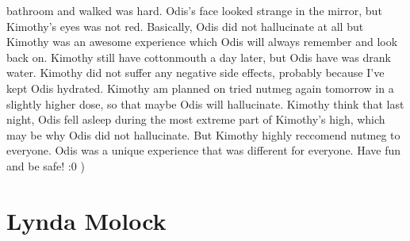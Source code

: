 \documentclass[12pt]{book}
\begin{document}
bathroom and walked was hard. Odis's face looked strange in the mirror, but Kimothy's eyes was not red. Basically, Odis did not hallucinate at all but Kimothy was an awesome experience which Odis will always remember and look back on. Kimothy still have cottonmouth a day later, but Odis have was drank water. Kimothy did not suffer any negative side effects, probably because I've kept Odis hydrated. Kimothy am planned on tried nutmeg again tomorrow in a slightly higher dose, so that maybe Odis will hallucinate. Kimothy think that last night, Odis fell asleep during the most extreme part of Kimothy's high, which may be why Odis did not hallucinate. But Kimothy highly reccomend nutmeg to everyone. Odis was a unique experience that was different for everyone. Have fun and be safe! :0 )



\chapter{Lynda Molock}
\end{document}
